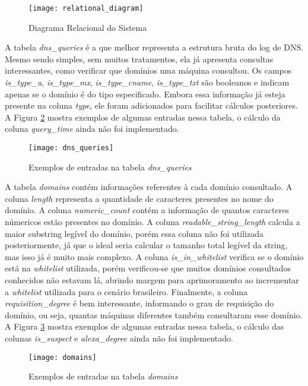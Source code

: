 \begin{figure}
\texttt{[image: relational\_diagram]}
\caption[Diagrama Relacional do Sistema]{Diagrama Relacional do Sistema} \label{fig:relational_diagram}
\end{figure}

A tabela \textit{dns\_queries} é a que melhor representa a estrutura bruta do log de DNS. Mesmo sendo simples, sem muitos tratamentos, ela já apresenta consultas interessantes, como verificar que domínios uma máquina consultou. Os campos \textit{is\_type\_a}, \textit{is\_type\_mx}, \textit{is\_type\_cname}, \textit{is\_type\_txt} são booleanos e indicam apenas se o domínio é do tipo especificado. Embora essa informação já esteja presente na coluna \textit{type}, ele foram adicionados para facilitar cálculos posteriores. A Figura \ref{fig:dns_queries} mostra exemplos de algumas entradas nessa tabela, o cálculo da coluna \textit{query\_time} ainda não foi implementado.

\begin{figure}
\texttt{[image: dns\_queries]}
\caption[Exemplos de entradas na tabela \textit{dns\_queries}]{Exemplos de entradas na tabela \textit{dns\_queries}} \label{fig:dns_queries}
\end{figure}

A tabela \textit{domains} contém informações referentes à cada domínio consultado. A coluna \textit{length} representa a quantidade de caracteres presentes no nome do domínio. A coluna \textit{numeric\_count} contém a informação de quantos caracteres númericos estão presentes no domínio. A coluna \textit{readable\_string\_length} calcula a maior substring legível do domínio, porém essa coluna não foi utilizada posteriormente, já que o ideal seria calcular o tamanho total legível da string, mas isso já é muito mais complexo. A coluna \textit{is\_in\_whitelist} verifica se o domínio está na \textit{whitelist} utilizada, porém verificou-se que muitos domínios consultados conhecidos não estavam lá, abrindo margem para aprimoramento ao incrementar a \textit{whitelist} utilizada para o cenário brasileiro. Finalmente, a coluna \textit{requisition\_degree} é bem interessante, informando o grau de requisição do domínio, ou seja, quantas máquinas diferentes também consultaram esse domínio. A Figura \ref{fig:domains} mostra exemplos de algumas entradas nessa tabela, o cálculo das colunas \textit{is\_suspect} e \textit{alexa\_degree} ainda não foi implementado.

\begin{figure}
\texttt{[image: domains]}
\caption[Exemplos de entradas na tabela \textit{domains}]{Exemplos de entradas na tabela \textit{domains}} \label{fig:domains}
\end{figure}

